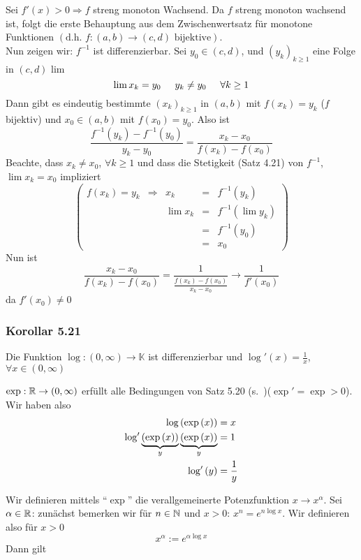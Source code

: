 \begin{beweis}{}
Sei $f'(x)>0\Rightarrow f$ streng monoton Wachsend. Da $f$ streng monoton wachsend ist, folgt die erste Behauptung aus dem Zwischenwertsatz für monotone Funktionen $\left( \text{d.h. }f:\left( a,b\right)\to\left( c,d\right)\text{ bijektive}\right)$.\\

Nun zeigen wir: $f^{-1}$ ist differenzierbar. Sei $y_0\in\left( c,d\right)$, und $\left( y_k\right)_{k\geq 1}$ eine Folge in $\left( c,d\right)$ lim
\[\lim x_k=y_0\hspace{5mm}y_k\not=y_0\hspace{5mm}\forall k\geq 1\]
Dann gibt es eindeutig bestimmte $\left( x_k\right)_{k\geq 1}$ in $\left( a,b\right)$ mit $f\left( x_k\right)=y_k$ ($f$ bijektiv) und $x_0\in\left( a,b\right)$ mit $f\left( x_0\right)=y_0$. Also ist
\[\frac{{{f^{ - 1}}\left( {{y_k}} \right) - {f^{ - 1}}\left( {{y_0}} \right)}}{{{y_k} - {y_0}}} = \frac{{{x_k} - {x_0}}}{{f\left( {{x_k}} \right) - f\left( {{x_0}} \right)}}\]
Beachte, dass $x_k\not=x_0$, $\forall k\geq 1$ und dass die Stetigkeit (Satz 4.21) von $f^{-1}$, $\lim x_k=x_0$ impliziert
\[\left( {\begin{array}{*{20}{c}}
{f\left( {{x_k}} \right) = {y_k}}& \Rightarrow &{{x_k}}& = &{{f^{ - 1}}\left( {{y_k}} \right)}\\
{}&{}&{\lim {x_k}}& = &{{f^{ - 1}}\left( {\lim {y_k}} \right)}\\
{}&{}&{}& = &{{f^{ - 1}}\left( {{y_0}} \right)}\\
{}&{}&{}& = &{{x_0}}
\end{array}} \right)\]
Nun ist
\[\frac{{{x_k} - {x_0}}}{{f\left( {{x_k}} \right) - f\left( {{x_0}} \right)}} = \frac{1}{{\frac{{f\left( {{x_k}} \right) - f\left( {{x_0}} \right)}}{{{x_k} - {x_0}}}}} \to \frac{1}{{f'\left( {{x_0}} \right)}}\]
da $f'\left( x_0\right)\not=0$
\end{beweis}

\subsubsection*{Korollar 5.21}
Die Funktion $\log :\left( 0,\infty\right)\to\mathbb{K}$ ist differenzierbar und $\log'(x)=\frac{1}{x}$, $\forall x\in\left( 0,\infty\right)$

\begin{beweis}{}
$\exp : \mathbb{R}\to\left( 0,\infty\right)$ erfüllt alle Bedingungen von Satz 5.20 (s.~\pageref{satz5.20})($\exp'=\exp>0$). Wir haben also
\begin{align*}
\log \left( {\exp \left( x \right)} \right) &= x\\
{\mathop{\rm log'}\nolimits} \underbrace {\left( {\exp \left( x \right)} \right)}_y\underbrace {\left( {\exp \left( x \right)} \right)}_y &= 1\\
{\mathop{\rm log'}\nolimits} \left( y \right) &= \frac{1}{y}
\end{align*}
\end{beweis}
Wir definieren mittels ``$\exp$'' die verallgemeinerte Potenzfunktion $x\to x^\alpha$. Sei $\alpha\in\mathbb{R}$: zunächst bemerken wir für $n\in\mathbb{N}$ und $x>0$: $x^n=e^{n\log x}$. Wir definieren also für $x>0$ \[x^\alpha := e^{\alpha\log x}\]
Dann gilt
